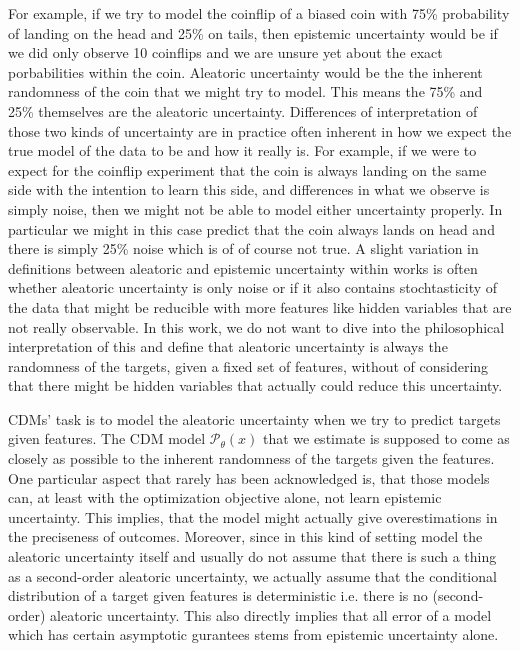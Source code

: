 For example, if we try to model the coinflip of a biased coin with 75\% probability of landing on the head and 25\% on tails, then epistemic uncertainty would be if we did only observe 10 coinflips and we are unsure yet about the exact porbabilities within the coin. Aleatoric uncertainty would be the the inherent randomness of the coin that we might try to model. This means the 75\% and 25\% themselves are the aleatoric uncertainty.
Differences of interpretation of those two kinds of uncertainty are in practice often inherent in how we expect the true model of the data to be and how it really is. For example, if we were to expect for the coinflip experiment that the coin is always landing on the same side with the intention to learn this side, and differences in what we observe is simply noise, then we might not be able to model either uncertainty properly. In particular we might in this case predict that the coin always lands on head and there is simply 25\% noise which is of of course not true.
A slight variation in definitions between aleatoric and epistemic uncertainty within works \cite{hullermeier_aleatoric_2021} is often whether aleatoric uncertainty is only noise or if it also contains stochtasticity of the data that might be reducible with more features like hidden variables that are not really observable. In this work, we do not want to dive into the philosophical interpretation of this and define that aleatoric uncertainty is always the randomness of the targets, given a fixed set of features, without of considering that there might be hidden variables that actually could reduce this uncertainty.

CDMs' task is to model the aleatoric uncertainty when we try to predict targets given features. The CDM model $\mathscr{P}_\theta(x)$ that we estimate is supposed to come as closely as possible to the inherent randomness of the targets given the features. One particular aspect that rarely has been acknowledged is, that those models can, at least with the optimization objective alone, not learn epistemic uncertainty. This implies, that the model might actually give overestimations in the preciseness of outcomes. Moreover, since in this kind of setting model the aleatoric uncertainty itself and usually do not assume that there is such a thing as a second-order aleatoric uncertainty, we actually assume that the conditional distribution of a target given features is deterministic i.e. there is no (second-order) aleatoric uncertainty. This also directly implies that all error of a model which has certain asymptotic gurantees stems from epistemic uncertainty alone.


